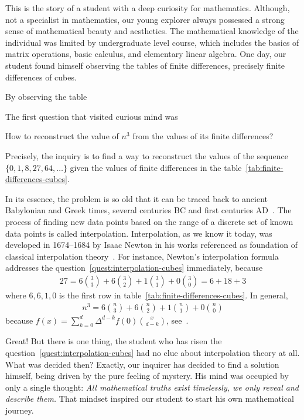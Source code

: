 This is the story of a student with a deep curiosity for mathematics.
Although, not a specialist in mathematics,
our young explorer always possessed a strong sense of mathematical beauty and aesthetics.
The mathematical knowledge of the individual was limited by undergraduate level course, which includes the basics of
matrix operations, basic calculus, and elementary linear algebra.
One day, our student found himself observing the tables of finite differences, precisely finite differences of cubes.

By observing the table

The first question that visited curious mind was
\begin{question}
    \label{quest:interpolation-cubes}
    How to reconstruct the value of $n^3$ from the values of its finite differences?
\end{question}
Precisely, the inquiry is to find a way to reconstruct the values of the sequence $\{0, 1, 8, 27, 64, \ldots\}$
given the values of finite differences in the table~\eqref{tab:finite-differences-cubes}.

In its essence, the problem is so old that it can be traced back
to ancient Babylonian and Greek times, several centuries BC and first centuries AD~\cite{gautschi2012interpolation}.
The process of finding new data points based on the range of a discrete set
of known data points is called interpolation.
Interpolation, as we know it today, was developed in 1674--1684 by Isaac Newton
in his works referenced as foundation of classical interpolation theory~\cite{meijering2002chronology}.
For instance, Newton's interpolation formula addresses the question~\eqref{quest:interpolation-cubes} immediately,
because
\begin{align*}
    27 = 6 \binom{3}{3} + 6 \binom{3}{2} + 1 \binom{3}{1} + 0\binom{3}{0} = 6 + 18 + 3
\end{align*}
where $6,6,1,0$ is the first row in table~\eqref{tab:finite-differences-cubes}.
In general,
\begin{align*}
    n^3 = 6 \binom{n}{3} + 6 \binom{n}{2} + 1\binom{n}{1} + 0 \binom{n}{0}
\end{align*}
because $f(x) = \sum_{k=0}^{d} \Delta^{d-k} f(0) \binom{x}{d-k}$, see~\cite[~p. 190]{graham1994concrete}.

Great!
But there is one thing, the student who has risen the question~\eqref{quest:interpolation-cubes}
had no clue about interpolation theory at all.
What was decided then?
Exactly, our inquirer has decided to find a solution himself, being driven by the pure feeling of mystery.
His mind was occupied by only a single thought:
\textit{All mathematical truths exist timelessly, we only reveal and describe them.}
That mindset inspired our student to start his own mathematical journey.


